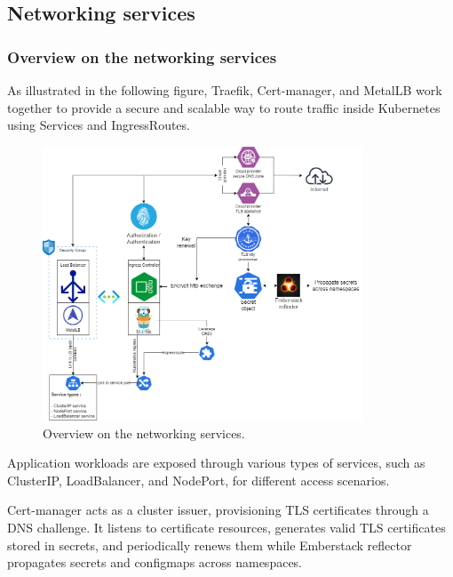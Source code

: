 \subsection{Networking services}

\subsubsection{Overview on the networking services}

\hspace{7mm}As illustrated in the following figure, Traefik, Cert-manager, and MetalLB work together to provide a secure and scalable way to route traffic inside Kubernetes using Services and IngressRoutes.

\begin{figure}[H]\centering
\includegraphics[width=0.85\textwidth,angle=00]{assets/f22.png}
\caption{ Overview on the networking services.}
\label{fig:Networking services}
\end{figure}

\hspace{7mm}Application workloads are exposed through various types of services, such as ClusterIP, LoadBalancer, and NodePort, for different access scenarios.

\hspace{7mm}Cert-manager acts as a cluster issuer, provisioning TLS certificates through a DNS challenge. It listens to certificate resources, generates valid TLS certificates stored in secrets, and periodically renews them while Emberstack reflector propagates secrets and configmaps across namespaces.

